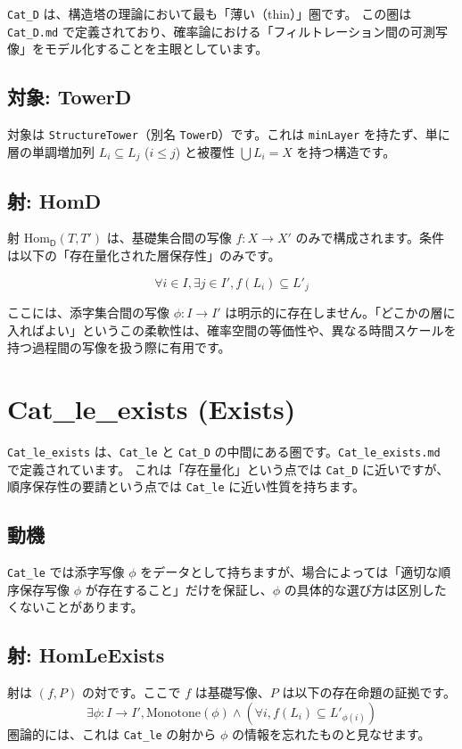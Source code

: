\documentclass[judge=standard,11pt]{jlreq}
\theoremstyle{definition}
\newcommand{\HomD}{\mathrm{Hom}_{\mathsf{D}}}
\begin{document}
\texttt{Cat\_D} は、構造塔の理論において最も「薄い（thin）」圏です。
この圏は \texttt{Cat\_D.md} で定義されており、確率論における「フィルトレーション間の可測写像」をモデル化することを主眼としています。

\subsection{対象: TowerD}
対象は \texttt{StructureTower}（別名 \texttt{TowerD}）です。これは \texttt{minLayer} を持たず、単に層の単調増加列 $L_i \subseteq L_j$ ($i \le j$) と被覆性 $\bigcup L_i = X$ を持つ構造です。

\subsection{射: HomD}
射 $\HomD(T, T')$ は、基礎集合間の写像 $f: X \to X'$ のみで構成されます。条件は以下の「存在量化された層保存性」のみです。

\[ \forall i \in I, \exists j \in I', f(L_i) \subseteq L'_j \]

ここには、添字集合間の写像 $\phi: I \to I'$ は明示的に存在しません。「どこかの層に入ればよい」というこの柔軟性は、確率空間の等価性や、異なる時間スケールを持つ過程間の写像を扱う際に有用です。

\section{Cat\_le\_exists (Exists)}

\texttt{Cat\_le\_exists} は、\texttt{Cat\_le} と \texttt{Cat\_D} の中間にある圏です。\texttt{Cat\_le\_exists.md} で定義されています。
これは「存在量化」という点では \texttt{Cat\_D} に近いですが、順序保存性の要請という点では \texttt{Cat\_le} に近い性質を持ちます。

\subsection{動機}
\texttt{Cat\_le} では添字写像 $\phi$ をデータとして持ちますが、場合によっては「適切な順序保存写像 $\phi$ が存在すること」だけを保証し、$\phi$ の具体的な選び方は区別したくないことがあります。

\subsection{射: HomLeExists}
射は $(f, P)$ の対です。ここで $f$ は基礎写像、$P$ は以下の存在命題の証拠です。
\[ \exists \phi: I \to I', \text{Monotone}(\phi) \land (\forall i, f(L_i) \subseteq L'_{\phi(i)}) \]
圏論的には、これは \texttt{Cat\_le} の射から $\phi$ の情報を忘れたものと見なせます。
\end{document}

